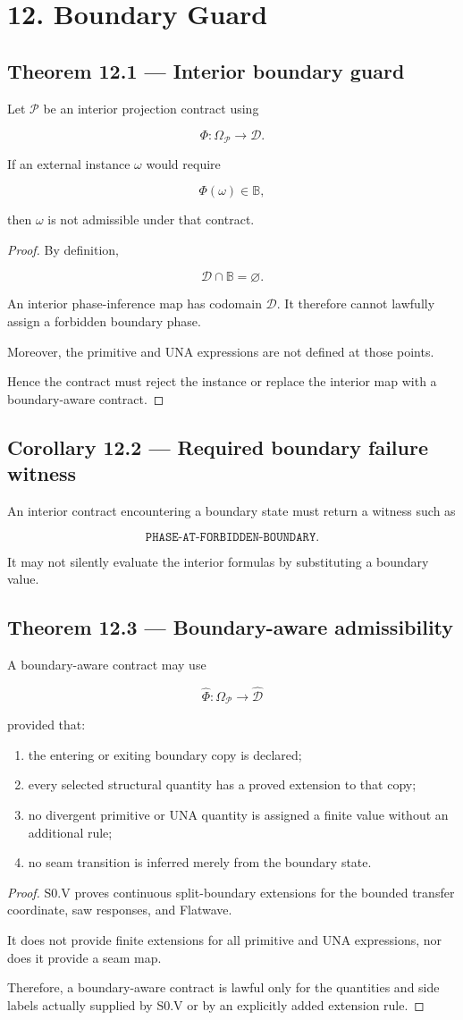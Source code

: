 \documentclass[11pt,oneside,openany]{book}
\newcommand{\PCsection}[1]{%
  \section*{#1}\addcontentsline{toc}{section}{#1}%
}
\newcommand{\PCsubsection}[1]{%
  \subsection*{#1}%
}
\begin{document}
\PCsection{12. Boundary Guard}

\PCsubsection{Theorem 12.1 --- Interior boundary guard}

Let \(\mathcal P\) be an interior projection contract using

\[
\Phi:\Omega_{\mathcal P}\to\mathcal D.
\]

If an external instance \(\omega\) would require

\[
\Phi(\omega)\in\mathbb B,
\]

then \(\omega\) is not admissible under that contract.

\begin{proof}
By definition,

\[
\mathcal D\cap\mathbb B=\varnothing.
\]

An interior phase-inference map has codomain \(\mathcal D\). It therefore cannot lawfully assign a forbidden boundary phase.

Moreover, the primitive and UNA expressions are not defined at those points.

Hence the contract must reject the instance or replace the interior map with a boundary-aware contract.

\end{proof}

\PCsubsection{Corollary 12.2 --- Required boundary failure witness}

An interior contract encountering a boundary state must return a witness such as

\[
\texttt{PHASE-AT-FORBIDDEN-BOUNDARY}.
\]

It may not silently evaluate the interior formulas by substituting a boundary value.

\PCsubsection{Theorem 12.3 --- Boundary-aware admissibility}

A boundary-aware contract may use

\[
\widehat\Phi: \Omega_{\mathcal P}\to\widehat{\mathcal D}
\]

provided that:

\begin{enumerate}
\item the entering or exiting boundary copy is declared;
\item every selected structural quantity has a proved extension to that copy;
\item no divergent primitive or UNA quantity is assigned a finite value without an additional rule;
\item no seam transition is inferred merely from the boundary state.
\end{enumerate}
\begin{proof}
S0.V proves continuous split-boundary extensions for the bounded transfer coordinate, saw responses, and Flatwave.

It does not provide finite extensions for all primitive and UNA expressions, nor does it provide a seam map.

Therefore, a boundary-aware contract is lawful only for the quantities and side labels actually supplied by S0.V or by an explicitly added extension rule.


\end{proof}
\end{document}
